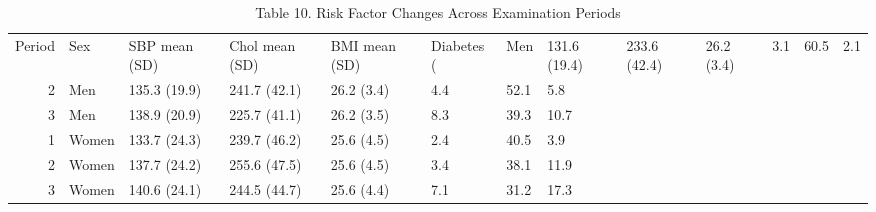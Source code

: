 \begin{table}[ht]
\centering
\caption{Table 10. Risk Factor Changes Across Examination Periods} 
\begin{tabular}{rlllllll}
  \toprule
Period & Sex & SBP mean (SD) & Chol mean (SD) & BMI mean (SD) & Diabetes (%
   & Men & 131.6 (19.4) & 233.6 (42.4) & 26.2 (3.4) & 3.1 & 60.5 & 2.1 \\ 
     2 & Men & 135.3 (19.9) & 241.7 (42.1) & 26.2 (3.4) & 4.4 & 52.1 & 5.8 \\ 
     3 & Men & 138.9 (20.9) & 225.7 (41.1) & 26.2 (3.5) & 8.3 & 39.3 & 10.7 \\ 
     1 & Women & 133.7 (24.3) & 239.7 (46.2) & 25.6 (4.5) & 2.4 & 40.5 & 3.9 \\ 
     2 & Women & 137.7 (24.2) & 255.6 (47.5) & 25.6 (4.5) & 3.4 & 38.1 & 11.9 \\ 
     3 & Women & 140.6 (24.1) & 244.5 (44.7) & 25.6 (4.4) & 7.1 & 31.2 & 17.3 \\ 
   \bottomrule
\end{tabular}
\end{table}
